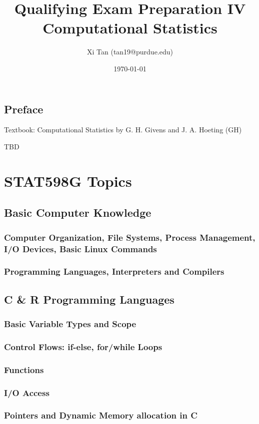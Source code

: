 \documentclass{report}
\title{Qualifying Exam Preparation IV \\Computational Statistics}
\author{Xi Tan (tan19@purdue.edu)}
\date{\today}
\begin{document}
\maketitle
\tableofcontents
\newpage

\chapter*{Preface}
Textbook: Computational Statistics by G. H. Givens and J. A. Hoeting (GH)

TBD

\part{STAT598G Topics}

\chapter{Basic Computer Knowledge}
\section{Computer Organization, File Systems, Process Management, I/O Devices, Basic Linux Commands}
\section{Programming Languages, Interpreters and Compilers}

\chapter{C \& R Programming Languages}
\section{Basic Variable Types and Scope}
\section{Control Flows: if-else, for/while Loops}
\section{Functions}
\section{I/O Access}
\section{Pointers and Dynamic Memory allocation in C}
\end{document}

